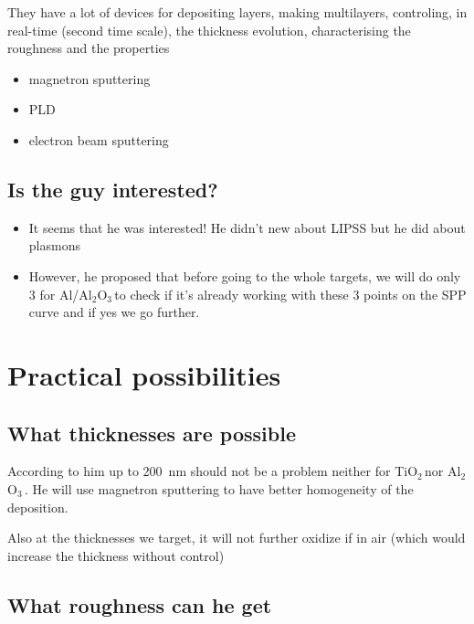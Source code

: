 \documentclass[11pt]{article}
\newcommand{\TiOO}{TiO$_2$\,}
\newcommand{\Alumina}{Al$_2$O$_3$\,}
\begin{document}
They have a lot of devices for depositing layers, making multilayers, controling, in real-time (second time scale), the thickness evolution, characterising the roughness and the properties
\begin{itemize}
\item magnetron sputtering
\item PLD
\item electron beam sputtering
\end{itemize}

\subsection*{Is the guy interested?}

\begin{itemize}
\item It seems that he was interested! He didn't new about LIPSS but he did about plasmons
\item However, he proposed that before going to the whole targets, we will do only 3 for Al/\Alumina to check if it's already working with these 3 points on the SPP curve and if yes we go further.
\end{itemize}



\pagebreak
\section{Practical possibilities}

\subsection*{What thicknesses are possible}

According to him up to 200~nm should not be a problem neither for \TiOO nor \Alumina. He will use magnetron sputtering to have better homogeneity of the deposition.

Also at the thicknesses we target, it will not further oxidize if in air (which would increase the thickness without control)

\subsection*{What roughness can he get}
\end{document}
